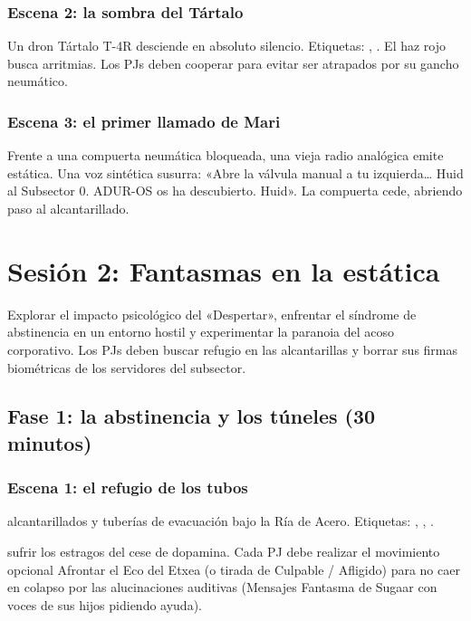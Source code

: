 \subsubsection{Escena 2: la sombra del Tártalo}
Un dron Tártalo T-4R desciende en absoluto silencio. Etiquetas: , . El haz rojo busca arritmias. Los PJs deben cooperar para evitar ser atrapados por su gancho neumático.

\subsubsection{Escena 3: el primer llamado de Mari}
Frente a una compuerta neumática bloqueada, una vieja radio analógica emite estática. Una voz sintética susurra: «Abre la válvula manual a tu izquierda\ldots{} Huid al Subsector 0. ADUR-OS os ha descubierto. Huid». La compuerta cede, abriendo paso al alcantarillado.

\section{Sesión 2: Fantasmas en la estática}


 Explorar el impacto psicológico del «Despertar», enfrentar el síndrome de abstinencia en un entorno hostil y experimentar la paranoia del acoso corporativo. Los PJs deben buscar refugio en las alcantarillas y borrar sus firmas biométricas de los servidores del subsector.

\subsection{Fase 1: la abstinencia y los túneles (30 minutos)}

\subsubsection{Escena 1: el refugio de los tubos}
 alcantarillados y tuberías de evacuación bajo la Ría de Acero. Etiquetas: , , .\par
{} sufrir los estragos del cese de dopamina. Cada PJ debe realizar el movimiento opcional Afrontar el Eco del Etxea (o tirada de Culpable / Afligido) para no caer en colapso por las alucinaciones auditivas (Mensajes Fantasma de Sugaar con voces de sus hijos pidiendo ayuda).

